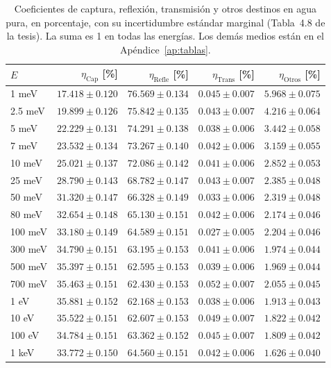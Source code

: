 \documentclass[11pt,a4paper]{article}
\begin{document}
\begin{table}[H]
\centering
\small
\caption{Coeficientes de captura, reflexión, transmisión y otros destinos en agua pura, en porcentaje, con su incertidumbre estándar marginal (Tabla~4.8 de la tesis). La suma es 1 en todas las energías. Los demás medios están en el Apéndice~\ref{ap:tablas}.}
\label{tab:coef-AP}
\begin{tabular}{@{}lrrrr@{}}
\toprule
$E$ & $\eta_\mathrm{Cap}$ [\%] & $\eta_\mathrm{Refle}$ [\%] & $\eta_\mathrm{Trans}$ [\%] & $\eta_\mathrm{Otros}$ [\%] \\
\midrule
1 meV & $17.418\pm0.120$ & $76.569\pm0.134$ & $0.045\pm0.007$ & $5.968\pm0.075$ \\
2.5 meV & $19.899\pm0.126$ & $75.842\pm0.135$ & $0.043\pm0.007$ & $4.216\pm0.064$ \\
5 meV & $22.229\pm0.131$ & $74.291\pm0.138$ & $0.038\pm0.006$ & $3.442\pm0.058$ \\
7 meV & $23.532\pm0.134$ & $73.267\pm0.140$ & $0.042\pm0.006$ & $3.159\pm0.055$ \\
10 meV & $25.021\pm0.137$ & $72.086\pm0.142$ & $0.041\pm0.006$ & $2.852\pm0.053$ \\
25 meV & $28.790\pm0.143$ & $68.782\pm0.147$ & $0.043\pm0.007$ & $2.385\pm0.048$ \\
50 meV & $31.320\pm0.147$ & $66.328\pm0.149$ & $0.033\pm0.006$ & $2.319\pm0.048$ \\
80 meV & $32.654\pm0.148$ & $65.130\pm0.151$ & $0.042\pm0.006$ & $2.174\pm0.046$ \\
100 meV & $33.180\pm0.149$ & $64.589\pm0.151$ & $0.027\pm0.005$ & $2.204\pm0.046$ \\
300 meV & $34.790\pm0.151$ & $63.195\pm0.153$ & $0.041\pm0.006$ & $1.974\pm0.044$ \\
500 meV & $35.397\pm0.151$ & $62.595\pm0.153$ & $0.039\pm0.006$ & $1.969\pm0.044$ \\
700 meV & $35.463\pm0.151$ & $62.430\pm0.153$ & $0.052\pm0.007$ & $2.055\pm0.045$ \\
1 eV & $35.881\pm0.152$ & $62.168\pm0.153$ & $0.038\pm0.006$ & $1.913\pm0.043$ \\
10 eV & $35.522\pm0.151$ & $62.607\pm0.153$ & $0.049\pm0.007$ & $1.822\pm0.042$ \\
100 eV & $34.784\pm0.151$ & $63.362\pm0.152$ & $0.045\pm0.007$ & $1.809\pm0.042$ \\
1 keV & $33.772\pm0.150$ & $64.560\pm0.151$ & $0.042\pm0.006$ & $1.626\pm0.040$ \\
\bottomrule
\end{tabular}
\end{table}
\end{document}
